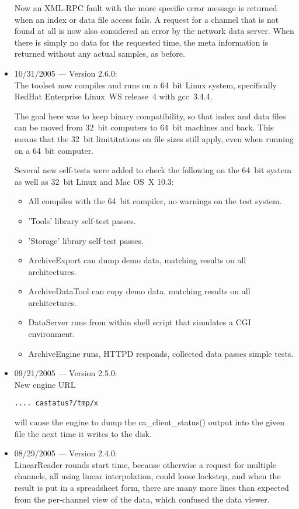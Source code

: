 \begin{itemize}
Now an XML-RPC fault with the more specific error
message is returned when an index or data file
access fails.
A request for a channel that is not found at all is now
also considered an error by the network data server.
When there is simply no data for the requested time,
the meta information is returned without any
actual samples, as before.

\item 10/31/2005 --- Version 2.6.0:\\
The toolset now compiles and runs on a 64~bit Linux system,
specifically RedHat Enterprise Linux~WS release~4
with gcc~3.4.4.

The goal here was to keep binary compatibility,
so that index and data files can be moved from
32~bit computers to 64~bit machines and back.
This means that the 32~bit limititations on
file sizes still apply, even when running
on a 64~bit computer.

Several new self-tests were added to check
the following on the 64~bit system as well
as 32~bit Linux and Mac OS~X 10.3:
\begin{itemize}
\item All compiles with the 64~bit compiler, no warnings on the test system.
\item 'Tools' library self-test passes.
\item 'Storage' library self-test passes.
\item ArchiveExport can dump demo data,
      matching results on all architectures.
\item ArchiveDataTool can copy demo data,
      matching results on all architectures.
\item DataServer runs from within shell script
      that simulates a CGI environment.
\item ArchiveEngine runs, HTTPD responds,
      collected data passes simple tests.
\end{itemize}

\item 09/21/2005 --- Version 2.5.0:\\
New engine URL
\begin{verbatim}
.... castatus?/tmp/x
\end{verbatim}
will cause the engine to dump the ca\_client\_status() output
into the given file the next time it writes to the disk.

\item 08/29/2005 --- Version 2.4.0:\\
LinearReader rounds start time,
because otherwise a request for multiple channels,
all using linear interpolation, could loose
lockstep, and when the result is put in a spreadsheet
form, there are many more lines than expected
from the per-channel view of the data,
which confused the data viewer.


\end{itemize}
